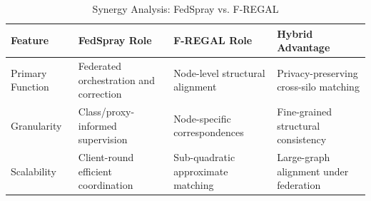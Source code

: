 \begin{table}[htbp]
    \centering
    \caption{Synergy Analysis: FedSpray vs. F-REGAL}
    \small
    \begin{tabularx}{\textwidth}{@{}p{}XXX@{}}
        \toprule
        \textbf{Feature} & \textbf{FedSpray Role} & \textbf{F-REGAL Role} & \textbf{Hybrid Advantage} \\ \midrule
        Primary Function & Federated orchestration and correction & Node-level structural alignment & Privacy-preserving cross-silo matching \\
        Granularity & Class/proxy-informed supervision & Node-specific correspondences & Fine-grained structural consistency \\
        Scalability & Client-round efficient coordination & Sub-quadratic approximate matching & Large-graph alignment under federation \\ \bottomrule
    \end{tabularx}
    \label{tab:synergy}
\end{table}